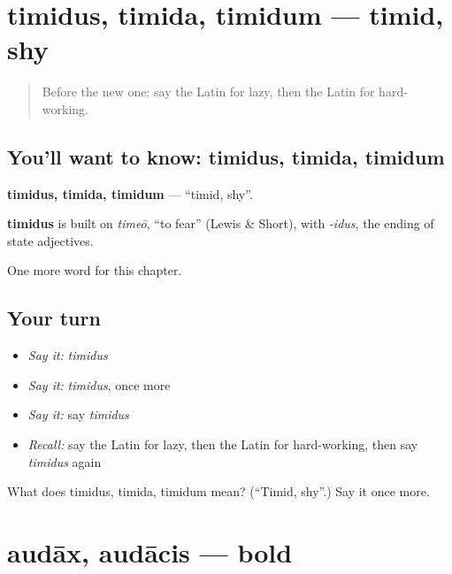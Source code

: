\section[timidus, timida, timidum]{timidus, timida, timidum — timid, shy}

\label{lesson:LA-C150-timidus}



\begin{quote}
Before the new one: say the Latin for lazy, then the Latin for hard-working.
\end{quote}

\subsection*{You'll want to know: timidus, timida, timidum}
\textbf{timidus, timida, timidum} — \textquotedblleft{}timid, shy\textquotedblright{}.

\begin{cousinweb}
\textbf{timidus} is built on \emph{timeō}, \textquotedblleft{}to fear\textquotedblright{} (Lewis \& Short), with \emph{-idus}, the ending of state adjectives.
\end{cousinweb}

\begin{grammarlens}[title={What you've built}]
One more word for this chapter.
\end{grammarlens}

\subsection*{Your turn}
\begin{itemize}
\raggedright
  \item \emph{Say it:} \emph{timidus}
  \item \emph{Say it:} \emph{timidus}, once more
  \item \emph{Say it:} say \emph{timidus}
  \item \emph{Recall:} say the Latin for lazy, then the Latin for hard-working, then say \emph{timidus} again
\end{itemize}

\begin{tcolorbox}[breakable,colback=teal!4,colframe=teal!35!black,title={Before you move on}]
What does timidus, timida, timidum mean? (\textquotedblleft{}Timid, shy\textquotedblright{}.) Say it once more.
\end{tcolorbox}
\section[audāx, audācis]{audāx, audācis — bold}

